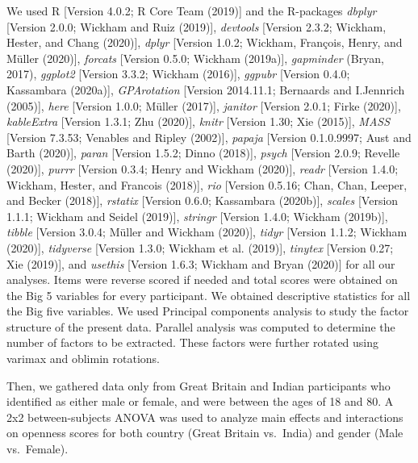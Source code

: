 \documentclass[
  english,
  man, fleqn, noextraspace]{apa6}
\begin{document}
We used R {[}Version 4.0.2; R Core Team (2019){]} and the R-packages \emph{dbplyr} {[}Version 2.0.0; Wickham and Ruiz (2019){]}, \emph{devtools} {[}Version 2.3.2; Wickham, Hester, and Chang (2020){]}, \emph{dplyr} {[}Version 1.0.2; Wickham, François, Henry, and Müller (2020){]}, \emph{forcats} {[}Version 0.5.0; Wickham (2019a){]}, \emph{gapminder} (Bryan, 2017), \emph{ggplot2} {[}Version 3.3.2; Wickham (2016){]}, \emph{ggpubr} {[}Version 0.4.0; Kassambara (2020a){]}, \emph{GPArotation} {[}Version 2014.11.1; Bernaards and I.Jennrich (2005){]}, \emph{here} {[}Version 1.0.0; Müller (2017){]}, \emph{janitor} {[}Version 2.0.1; Firke (2020){]}, \emph{kableExtra} {[}Version 1.3.1; Zhu (2020){]}, \emph{knitr} {[}Version 1.30; Xie (2015){]}, \emph{MASS} {[}Version 7.3.53; Venables and Ripley (2002){]}, \emph{papaja} {[}Version 0.1.0.9997; Aust and Barth (2020){]}, \emph{paran} {[}Version 1.5.2; Dinno (2018){]}, \emph{psych} {[}Version 2.0.9; Revelle (2020){]}, \emph{purrr} {[}Version 0.3.4; Henry and Wickham (2020){]}, \emph{readr} {[}Version 1.4.0; Wickham, Hester, and Francois (2018){]}, \emph{rio} {[}Version 0.5.16; Chan, Chan, Leeper, and Becker (2018){]}, \emph{rstatix} {[}Version 0.6.0; Kassambara (2020b){]}, \emph{scales} {[}Version 1.1.1; Wickham and Seidel (2019){]}, \emph{stringr} {[}Version 1.4.0; Wickham (2019b){]}, \emph{tibble} {[}Version 3.0.4; Müller and Wickham (2020){]}, \emph{tidyr} {[}Version 1.1.2; Wickham (2020){]}, \emph{tidyverse} {[}Version 1.3.0; Wickham et al. (2019){]}, \emph{tinytex} {[}Version 0.27; Xie (2019){]}, and \emph{usethis} {[}Version 1.6.3; Wickham and Bryan (2020){]} for all our analyses. Items were reverse scored if needed and total scores were obtained on the Big 5 variables for every participant. We obtained descriptive statistics for all the Big five variables. We used Principal components analysis to study the factor structure of the present data. Parallel analysis was computed to determine the number of factors to be extracted. These factors were further rotated using varimax and oblimin rotations.

Then, we gathered data only from Great Britain and Indian participants who identified as either male or female, and were between the ages of 18 and 80. A 2x2 between-subjects ANOVA was used to analyze main effects and interactions on openness scores for both country (Great Britain vs.~India) and gender (Male vs.~Female).
\end{document}
